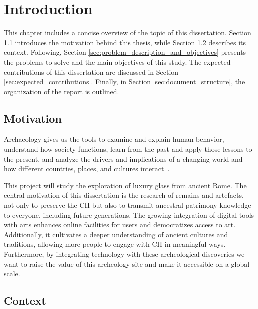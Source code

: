 
%

\chapter{Introduction}
\label{cha:introduction}

This chapter includes a concise overview of the topic of this dissertation. 
Section \ref{sec:motivation} introduces the motivation behind this thesis, while Section \ref{sec:context} describes its context.
Following, Section \ref{sec:problem_description_and_objectives} presents the problems to solve and the main objectives of this study. 
The expected contributions of this dissertation are discussed in Section \ref{sec:expected_contributions}.
Finally, in Section \ref{sec:document_structure}, the organization of the report is outlined.

\section{Motivation}
\label{sec:motivation}
Archaeology gives us the tools to examine and explain human behavior, understand how 
society functions, learn from the past and apply those lessons to the present, and analyze
the drivers and implications of a changing world and how different countries, places, and cultures interact~\cite{oxfordarchaeology2025}.

This project will study the exploration of luxury glass from ancient Rome.
The central motivation of this dissertation is the research of remains and artefacts, not
only to preserve the \gls{CH} but also to transmit ancestral patrimony knowledge to everyone, including future generations. 
The growing integration of digital tools with arts enhances online 
facilities for users and democratizes access to art. Additionally, it cultivates a deeper understanding of ancient cultures and traditions, allowing more people to engage with
\gls{CH} in meaningful ways. Furthermore, by integrating technology with these archeological 
discoveries we want to raise the value of this archeology site and make it accessible on a global scale.


\section{Context}
\label{sec:context}

